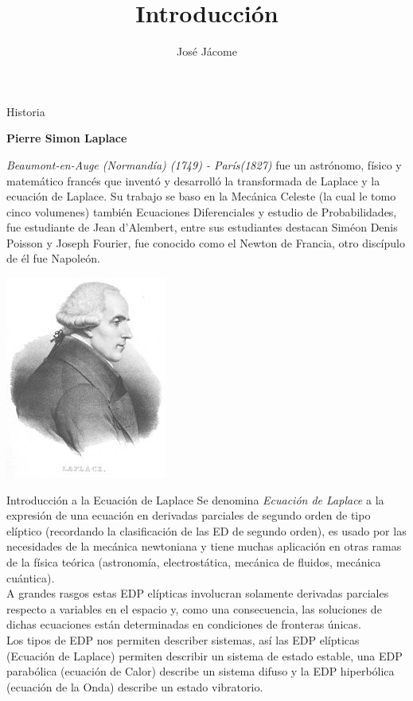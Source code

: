 \documentclass[11pt]{beamer}
\author{José Jácome}
\title{Introducción}
\begin{document}
\begin{frame}
\titlepage
\end{frame}


\begin{frame}{Historia}

\begin{center}
\textbf{Pierre Simon Laplace}
\end{center}

\textit{Beaumont-en-Auge (Normandía) (1749) - París(1827)} fue un astrónomo, físico y matemático francés que inventó y desarrolló la transformada de Laplace y la ecuación de Laplace. Su trabajo se baso en la Mecánica Celeste (la cual le tomo cinco volumenes) también Ecuaciones Diferenciales y estudio de Probabilidades, fue estudiante de Jean d'Alembert, entre sus estudiantes destacan Siméon Denis Poisson y Joseph Fourier, fue conocido como el Newton de Francia, otro discípulo de él fue Napoleón.
\begin{center}
\includegraphics[scale=1.2]{Laplace.jpg}
\end{center}
\end{frame}

\begin{frame}{Introducción a la Ecuación de Laplace}
Se denomina \textit{Ecuación de Laplace} a la expresión de una ecuación en derivadas parciales de segundo orden de tipo elíptico (recordando la clasificación de las ED de segundo orden), es usado por las necesidades de la mecánica newtoniana y tiene muchas aplicación en otras ramas de la física teórica (astronomía, electrostática, mecánica de fluidos, mecánica cuántica).\\

A grandes rasgos estas EDP elípticas involucran solamente derivadas parciales respecto a variables en el espacio y, como una consecuencia, las soluciones de dichas ecuaciones están determinadas en condiciones de fronteras únicas.\\

Los tipos de EDP nos permiten describer sistemas, así las EDP elípticas (Ecuación de Laplace) permiten describir un sistema de estado estable, una EDP parabólica (ecuación de Calor) describe un sistema difuso y la EDP hiperbólica (ecuación de la Onda) describe un estado vibratorio.

\end{frame}
\end{document}
